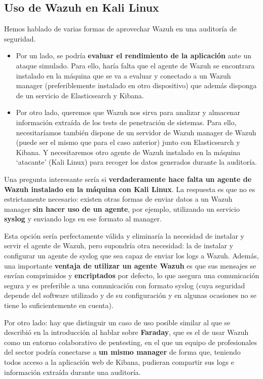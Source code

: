 \subsection{Uso de Wazuh en Kali Linux}\label{sec:wazuh_kali}

Hemos hablado de varias formas de aprovechar Wazuh en una auditoría de seguridad. 

\begin{itemize}
    \item Por un lado, se podría \textbf{evaluar el rendimiento de la aplicación} ante un ataque simulado. Para ello, haría falta que el agente de Wazuh se encontrara instalado en la máquina que se va a evaluar y conectado a un Wazuh manager (preferiblemente instalado en otro dispositivo)  que además disponga de un servicio de Elasticsearch y Kibana.
    \item Por otro lado, queremos que Wazuh nos sirva para analizar y almacenar información extraída de los tests de penetración de sistemas. Para ello, necesitaríamos también dispone de un servidor de Wazuh manager de Wazuh (puede ser el mismo que para el caso anterior) junto con Elasticsearch y Kibana. Y necesitaremos otro agente de Wazuh instalado en la máquina `atacante' (Kali Linux) para recoger los datos generados durante la auditoría.
\end{itemize}

Una pregunta interesante sería si \textbf{verdaderamente hace falta un agente de Wazuh instalado en la máquina con Kali Linux}. La respuesta es que no es estrictamente necesario: existen otras formas de enviar datos a un Wazuh manager \textbf{sin hacer uso de un agente}, por ejemplo, utilizando un servicio \textbf{syslog} y enviando logs en ese formato al manager.

Esta opción sería perfectamente válida y eliminaría la necesidad de instalar y servir el agente de Wazuh, pero supondría otra necesidad: la de instalar y configurar un agente de syslog que sea capaz de enviar los logs a Wazuh. Además, una importante \textbf{ventaja de utilizar un agente Wazuh} es que sus mensajes se envían comprimidos y \textbf{encriptados} por defecto, lo que asegura una comunicación segura y es preferible a una comunicación con formato syslog (cuya seguridad depende del software utilizado y de su configuración y en algunas ocasiones no se tiene lo suficientemente en cuenta).

Por otro lado: hay que distinguir un caso de uso posible similar al que se describió en la introducción al hablar sobre \textbf{Faraday}, que es el de usar Wazuh como un entorno colaborativo de pentesting, en el que un equipo de profesionales del sector podría conectarse a \textbf{un mismo manager} de forma que, teniendo todos acceso a la aplicación web de Kibana, pudieran compartir sus logs e información extraída durante una auditoría.


